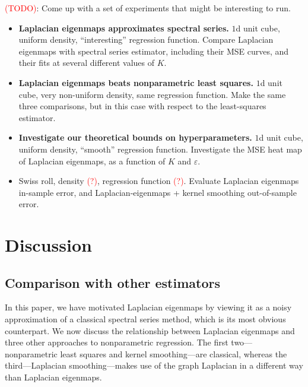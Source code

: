 \documentclass{article}
\newcommand{\1}{\mathbf{1}}
\theoremstyle{alden}
\theoremstyle{aldenthm}
\theoremstyle{definition}
\theoremstyle{remark}
\begin{document}
\textcolor{red}{(TODO)}: Come up with a set of experiments that might be interesting to run. 

\begin{itemize}
	\item \textbf{Laplacian eigenmaps approximates spectral series.} $1$d unit cube, uniform density, ``interesting'' regression function. Compare Laplacian eigenmaps with spectral series estimator, including their MSE curves, and their fits at several different values of $K$. 
	\item \textbf{Laplacian eigenmaps beats nonparametric least squares.} $1$d unit cube, very non-uniform density, same regression function. Make the same three comparisons, but in this case with respect to the least-squares estimator.
	\item \textbf{Investigate our theoretical bounds on hyperparameters.} $1$d unit cube, uniform density, ``smooth'' regression function. Investigate the MSE heat map of Laplacian eigenmaps, as a function of $K$ and $\varepsilon$.
	\item Swiss roll, density \textcolor{red}{(?)}, regression function \textcolor{red}{(?)}. Evaluate Laplacian eigenmaps in-sample error, and Laplacian-eigenmaps + kernel smoothing out-of-sample error.
\end{itemize}

\section{Discussion}
\label{sec:discussion}

\subsection{Comparison with other estimators}
In this paper, we have motivated Laplacian eigenmaps by viewing it as a noisy approximation of a classical spectral series method, which is its most obvious counterpart. We now discuss the relationship between Laplacian eigenmaps and three other approaches to nonparametric regression. The first two---nonparametric least squares and kernel smoothing---are classical, whereas the third---Laplacian smoothing---makes use of the graph Laplacian in a different way than Laplacian eigenmaps.
\end{document}
